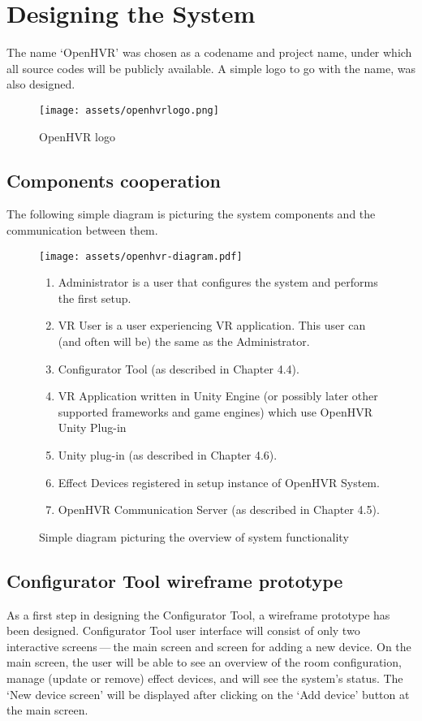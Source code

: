 \chapter{Designing the System}

The name `OpenHVR' was chosen as a codename and project name, under which
all source codes will be publicly available. A simple logo to
go with the name, was also designed.

\begin{figure}[h]{}
\centering\texttt{[image: assets/openhvrlogo.png]}
\caption{OpenHVR logo}
\end{figure}

\hypertarget{x-components-cooperation}{\section{Components cooperation}}
The following simple diagram is picturing the system components and the
communication between them.


\begin{figure}[h]{}
\centering\texttt{[image: assets/openhvr-diagram.pdf]}
\caption{Simple diagram picturing the overview of system functionality}
\begin{enumerate}
    \item Administrator is a user that configures the system and performs the first setup.
    \item VR User is a user experiencing VR application. This user can (and often will be) the same as the Administrator.
    \item Configurator Tool (as described in Chapter 4.4).
    \item VR Application written in Unity Engine (or possibly later other supported frameworks and game engines) which use OpenHVR Unity Plug-in
    \item Unity plug-in (as described in Chapter 4.6).
    \item Effect Devices registered in setup instance of OpenHVR System.
    \item OpenHVR Communication Server (as described in Chapter 4.5).
\end{enumerate}
\end{figure}


\hypertarget{x-configurator-tool-wireframe-prototype}{\section{Configurator Tool wireframe prototype}}
As a first step in designing the Configurator Tool, a wireframe prototype
has been designed. Configurator Tool user interface will consist of only
two interactive screens — the main screen and screen for adding a new device.
On the main screen, the user will be able to see an overview of the room configuration,
manage (update or remove) effect devices, and will see the system’s status.
The `New device screen' will be displayed after clicking on the `Add device'
button at the main screen.


